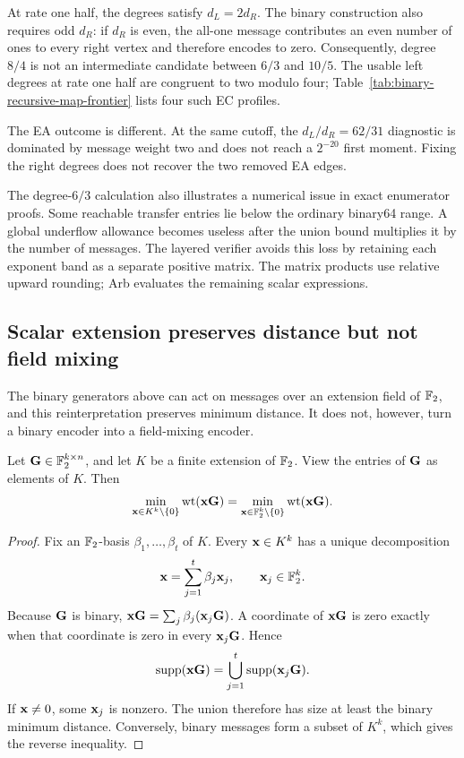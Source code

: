 At rate one half, the degrees satisfy $d_L=2d_R$.  The binary construction
also requires odd $d_R$: if $d_R$ is even, the all-one message contributes an
even number of ones to every right vertex and therefore encodes to zero.
Consequently, degree $8/4$ is not an intermediate candidate between $6/3$
and $10/5$.  The usable left degrees at rate one half are congruent to two
modulo four; Table~\ref{tab:binary-recursive-map-frontier} lists four such EC
profiles.

The EA outcome is different.  At the same cutoff, the $d_L/d_R=62/31$
diagnostic is dominated by message weight two and does not reach a $2^{-20}$
first moment.  Fixing the right degrees does not recover the two removed EA
edges.

The degree-$6/3$ calculation also illustrates a numerical issue in exact
enumerator proofs.  Some reachable transfer entries lie below the ordinary
binary64 range.  A global underflow allowance becomes useless after the union
bound multiplies it by the number of messages.  The layered verifier avoids
this loss by retaining each exponent band as a separate positive matrix.
The matrix products use relative upward rounding; Arb evaluates the remaining
scalar expressions.

\subsection{Scalar extension preserves distance but not field mixing}

The binary generators above can act on messages over an extension field of
$\mathbb F_2$, and this reinterpretation preserves minimum distance.  It does not,
however, turn a binary encoder into a field-mixing encoder.

\begin{lemma}
\label{lem:binary-scalar-extension}
Let $\mathbf G\in\mathbb F_2^{k\times n}$, and let $K$ be a finite extension of $\mathbb F_2$.
View the entries of $\mathbf G$ as elements of $K$.  Then
\begin{equation}
 \min_{\mathbf x\in K^k\setminus\{0\}}\operatorname{wt}(\mathbf x\mathbf G)
 =
 \min_{\mathbf x\in\mathbb F_2^k\setminus\{0\}}\operatorname{wt}(\mathbf x\mathbf G).
 \label{eq:binary-scalar-extension-distance}
\end{equation}
\end{lemma}

\begin{proof}
Fix an $\mathbb F_2$-basis $\beta_1,\ldots,\beta_t$ of $K$.  Every
$\mathbf x\in K^k$ has a unique decomposition
\begin{equation*}
 \mathbf x=\sum_{j=1}^{t}\beta_j\mathbf x_j,
 \qquad \mathbf x_j\in\mathbb F_2^k.
\end{equation*}
Because $\mathbf G$ is binary,
$\mathbf x\mathbf G=\sum_j\beta_j(\mathbf x_j\mathbf G)$.  A coordinate of $\mathbf x\mathbf G$ is zero exactly when
that coordinate is zero in every $\mathbf x_j\mathbf G$.  Hence
\begin{equation*}
 \operatorname{supp}(\mathbf x\mathbf G)=\bigcup_{j=1}^{t}\operatorname{supp}(\mathbf x_j\mathbf G).
\end{equation*}
If $\mathbf x\ne0$, some $\mathbf x_j$ is nonzero.  The union therefore has size at least
the binary minimum distance.  Conversely, binary messages form a subset of
$K^k$, which gives the reverse inequality.
\end{proof}

